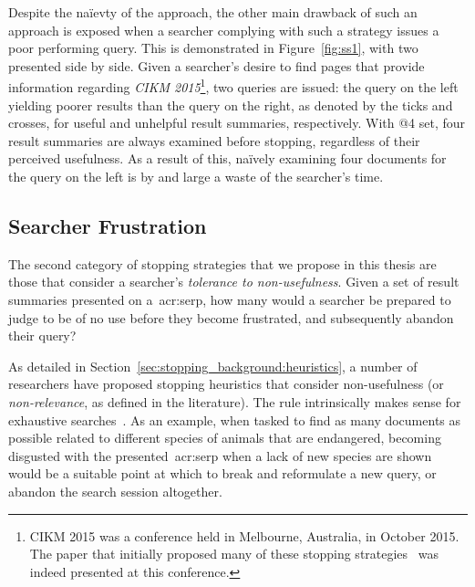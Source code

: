 Despite the na\"{i}evty of the approach, the other main drawback of such an approach is exposed when a searcher complying with such a strategy issues a poor performing query. This is demonstrated in Figure~\ref{fig:ss1}, with two~ presented side by side. Given a searcher's desire to find pages that provide information regarding \emph{CIKM 2015}\footnote{CIKM 2015 was a conference held in Melbourne, Australia, in October 2015. The paper that initially proposed many of these stopping strategies~\cite{maxwell2015stopping_strategies} was indeed presented at this conference.}, two queries are issued: the query on the left yielding poorer results than the query on the right, as denoted by the ticks and crosses, for useful and unhelpful result summaries, respectively. With  @4 set, four result summaries are always examined before stopping, regardless of their perceived usefulness. As a result of this, na\"{i}vely examining four documents for the query on the left is by and large a waste of the searcher's time.

\subsection{Searcher Frustration}


The second category of stopping strategies that we propose in this thesis are those that consider a searcher's \emph{tolerance to non-usefulness}. Given a set of result summaries presented on a~\gls{acr:serp}, how many would a searcher be prepared to judge to be of no use before they become frustrated, and subsequently abandon their query?

As detailed in Section~\ref{sec:stopping_background:heuristics}, a number of researchers have proposed stopping heuristics that consider non-usefulness (or \emph{non-relevance}, as defined in the literature). The rule intrinsically makes sense for exhaustive searches~\cite{kraft1979stopping_rules}. As an example, when tasked to find as many documents as possible related to different species of animals that are endangered, becoming disgusted with the presented~\gls{acr:serp} when a lack of new species are shown would be a suitable point at which to break and reformulate a new query, or abandon the search session altogether.

